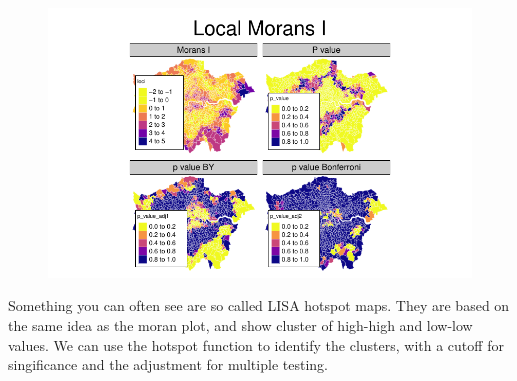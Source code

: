 \documentclass[
  letterpaper,
  DIV=11,
  numbers=noendperiod]{scrreprt}
\begin{document}
\begin{figure}[H]

{\centering \includegraphics{04_dependence_files/figure-pdf/unnamed-chunk-18-1.pdf}

}

\end{figure}

Something you can often see are so called LISA hotspot maps. They are
based on the same idea as the moran plot, and show cluster of high-high
and low-low values. We can use the hotspot function to identify the
clusters, with a cutoff for singificance and the adjustment for multiple
testing.
\end{document}
